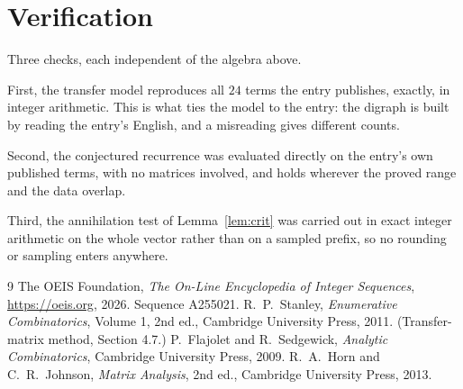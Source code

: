 \documentclass[11pt,a4paper]{article}
\theoremstyle{plain}
\theoremstyle{definition}
\begin{document}
\section{Verification}

Three checks, each independent of the algebra above.

First, the transfer model reproduces all $24$ terms the entry publishes, exactly, in
integer arithmetic. This is what ties the model to the entry: the digraph is built by reading
the entry's English, and a misreading gives different counts.

Second, the conjectured recurrence was evaluated directly on the entry's own published terms,
with no matrices involved, and holds wherever the proved range and the data overlap.

Third, the annihilation test of Lemma~\ref{lem:crit} was carried out in exact integer
arithmetic on the whole vector rather than on a sampled prefix, so no rounding or sampling
enters anywhere.

\begin{thebibliography}{9}
 The OEIS Foundation, \emph{The On-Line Encyclopedia of Integer
Sequences}, \url{https://oeis.org}, 2026. Sequence A255021.
 R.~P.~Stanley, \emph{Enumerative Combinatorics}, Volume 1, 2nd ed.,
Cambridge University Press, 2011. (Transfer-matrix method, Section 4.7.)
 P.~Flajolet and R.~Sedgewick, \emph{Analytic Combinatorics}, Cambridge
University Press, 2009.
 R.~A.~Horn and C.~R.~Johnson, \emph{Matrix Analysis}, 2nd ed., Cambridge
University Press, 2013.
\end{thebibliography}
\end{document}
